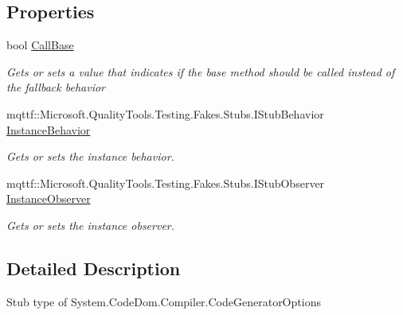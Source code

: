 \subsection*{Properties}
\begin{DoxyCompactItemize}
\item 
bool \hyperlink{class_system_1_1_code_dom_1_1_compiler_1_1_fakes_1_1_stub_code_generator_options_a33fce5f5941b1ce8653b8d22ab23b48a}{Call\-Base}
\begin{DoxyCompactList}\small\item\em Gets or sets a value that indicates if the base method should be called instead of the fallback behavior\end{DoxyCompactList}\item 
mqttf\-::\-Microsoft.\-Quality\-Tools.\-Testing.\-Fakes.\-Stubs.\-I\-Stub\-Behavior \hyperlink{class_system_1_1_code_dom_1_1_compiler_1_1_fakes_1_1_stub_code_generator_options_a0c1a61320fbf4cb8d6f403a722808de3}{Instance\-Behavior}
\begin{DoxyCompactList}\small\item\em Gets or sets the instance behavior.\end{DoxyCompactList}\item 
mqttf\-::\-Microsoft.\-Quality\-Tools.\-Testing.\-Fakes.\-Stubs.\-I\-Stub\-Observer \hyperlink{class_system_1_1_code_dom_1_1_compiler_1_1_fakes_1_1_stub_code_generator_options_a3636c4fd0f976f2a78ba8eb359e9c88d}{Instance\-Observer}
\begin{DoxyCompactList}\small\item\em Gets or sets the instance observer.\end{DoxyCompactList}\end{DoxyCompactItemize}


\subsection{Detailed Description}
Stub type of System.\-Code\-Dom.\-Compiler.\-Code\-Generator\-Options




